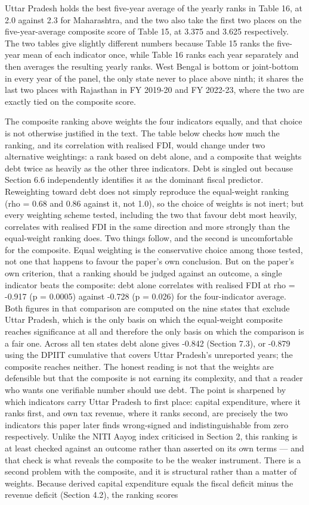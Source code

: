 \documentclass[12pt,a4paper]{article}
\begin{document}
Uttar Pradesh holds the best five-year average of the yearly ranks in Table 16, at 2.0 against 2.3 for Maharashtra, and the two also take the first two places on the five-year-average composite score of Table 15, at 3.375 and 3.625 respectively. The two tables give slightly different numbers because Table 15 ranks the five-year mean of each indicator once, while Table 16 ranks each year separately and then averages the resulting yearly ranks. West Bengal is bottom or joint-bottom in every year of the panel, the only state never to place above ninth; it shares the last two places with Rajasthan in FY 2019-20 and FY 2022-23, where the two are exactly tied on the composite score.

The composite ranking above weights the four indicators equally, and that choice is not otherwise justified in the text. The table below checks how much the ranking, and its correlation with realised FDI, would change under two alternative weightings: a rank based on debt alone, and a composite that weights debt twice as heavily as the other three indicators. Debt is singled out because Section 6.6 independently identifies it as the dominant fiscal predictor. Reweighting toward debt does not simply reproduce the equal-weight ranking (rho = 0.68 and 0.86 against it, not 1.0), so the choice of weights is not inert; but every weighting scheme tested, including the two that favour debt most heavily, correlates with realised FDI in the same direction and more strongly than the equal-weight ranking does. Two things follow, and the second is uncomfortable for the composite. Equal weighting is the conservative choice among those tested, not one that happens to favour the paper's own conclusion. But on the paper's own criterion, that a ranking should be judged against an outcome, a single indicator beats the composite: debt alone correlates with realised FDI at rho = -0.917 (p = 0.0005) against -0.728 (p = 0.026) for the four-indicator average. Both figures in that comparison are computed on the nine states that exclude Uttar Pradesh, which is the only basis on which the equal-weight composite reaches significance at all and therefore the only basis on which the comparison is a fair one. Across all ten states debt alone gives -0.842 (Section 7.3), or -0.879 using the DPIIT cumulative that covers Uttar Pradesh's unreported years; the composite reaches neither. The honest reading is not that the weights are defensible but that the composite is not earning its complexity, and that a reader who wants one verifiable number should use debt. The point is sharpened by which indicators carry Uttar Pradesh to first place: capital expenditure, where it ranks first, and own tax revenue, where it ranks second, are precisely the two indicators this paper later finds wrong-signed and indistinguishable from zero respectively. Unlike the NITI Aayog index criticised in Section 2, this ranking is at least checked against an outcome rather than asserted on its own terms --- and that check is what reveals the composite to be the weaker instrument. There is a second problem with the composite, and it is structural rather than a matter of weights. Because derived capital expenditure equals the fiscal deficit minus the revenue deficit (Section 4.2), the ranking scores 
\end{document}
